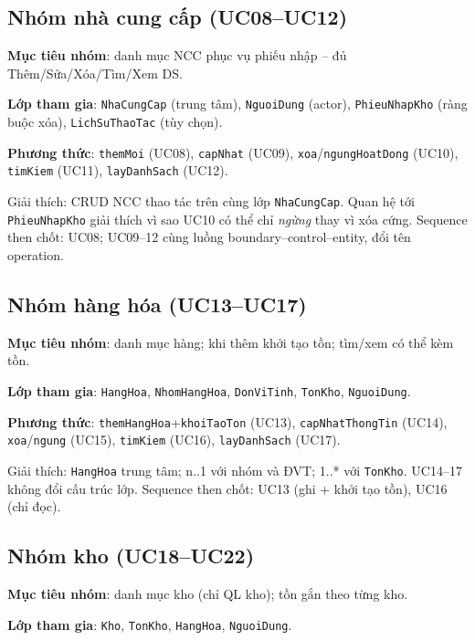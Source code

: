 \subsection{Nhóm nhà cung cấp (UC08--UC12)}

\textbf{Mục tiêu nhóm}: danh mục NCC phục vụ phiếu nhập -- đủ Thêm/Sửa/Xóa/Tìm/Xem DS.

\textbf{Lớp tham gia}: \texttt{NhaCungCap} (trung tâm), \texttt{NguoiDung} (actor), \texttt{PhieuNhapKho} (ràng buộc xóa), \texttt{LichSuThaoTac} (tùy chọn).

\textbf{Phương thức}: \texttt{themMoi} (UC08), \texttt{capNhat} (UC09), \texttt{xoa}/\texttt{ngungHoatDong} (UC10), \texttt{timKiem} (UC11), \texttt{layDanhSach} (UC12).



Giải thích: CRUD NCC thao tác trên cùng lớp \texttt{NhaCungCap}. Quan hệ tới \texttt{PhieuNhapKho} giải thích vì sao UC10 có thể chỉ \textit{ngừng} thay vì xóa cứng. Sequence then chốt: UC08; UC09--12 cùng luồng boundary--control--entity, đổi tên operation.

\subsection{Nhóm hàng hóa (UC13--UC17)}

\textbf{Mục tiêu nhóm}: danh mục hàng; khi thêm khởi tạo tồn; tìm/xem có thể kèm tồn.

\textbf{Lớp tham gia}: \texttt{HangHoa}, \texttt{NhomHangHoa}, \texttt{DonViTinh}, \texttt{TonKho}, \texttt{NguoiDung}.

\textbf{Phương thức}: \texttt{themHangHoa}+\texttt{khoiTaoTon} (UC13), \texttt{capNhatThongTin} (UC14), \texttt{xoa}/\texttt{ngung} (UC15), \texttt{timKiem} (UC16), \texttt{layDanhSach} (UC17).



Giải thích: \texttt{HangHoa} trung tâm; n..1 với nhóm và ĐVT; 1..* với \texttt{TonKho}. UC14--17 không đổi cấu trúc lớp. Sequence then chốt: UC13 (ghi + khởi tạo tồn), UC16 (chỉ đọc).

\subsection{Nhóm kho (UC18--UC22)}

\textbf{Mục tiêu nhóm}: danh mục kho (chỉ QL kho); tồn gắn theo từng kho.

\textbf{Lớp tham gia}: \texttt{Kho}, \texttt{TonKho}, \texttt{HangHoa}, \texttt{NguoiDung}.

